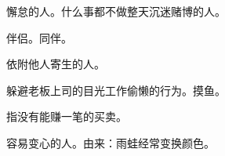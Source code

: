 \orignextpage

{懈怠的人。什么事都不做整天沉迷赌博的人。}

{伴侣。同伴。}

{依附他人寄生的人。}

{躲避老板上司的目光工作偷懒的行为。摸鱼。}

{指没有能赚一笔的买卖。}

{容易变心的人。由来：雨蛙经常变换颜色。}

